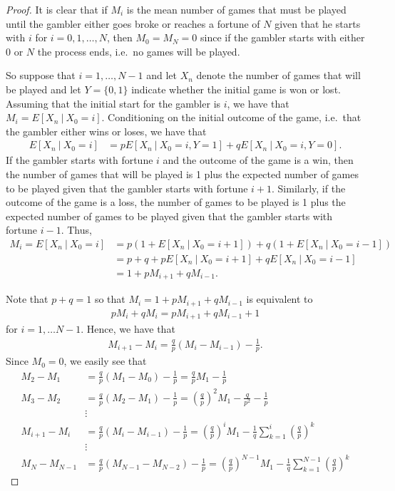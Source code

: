 \begin{proof}
  It is clear that if $M_i$ is the mean number of games that must be played until
  the gambler either goes broke or reaches a fortune of $N$ given that he
  starts with $i$ for $i =0,1,\dots,N$,
  then $M_0 = M_N = 0$ since if the gambler starts with either $0$ or $N$ the process ends, i.e.\
  no games will be played.

  So suppose that $i = 1, \dots, N -1$ and let $X_n$ denote the number of games that will be played
  and let $Y = \{0, 1\}$ indicate whether the initial game is won or lost.
  Assuming that the initial start for the gambler is $i$, we have that $M_i = E[X_n \ |\ X_0 = i]$.
  Conditioning on the initial outcome of the game, i.e.\ that the gambler either wins or loses, we have that
  \begin{align*}
    E[X_n \ |\ X_0 = i] &= p E[X_n \ |\ X_0 = i, Y=1] + q E[X_n \ |\ X_0 = i, Y= 0].
  \end{align*}
  If the gambler starts with fortune $i$ and the outcome of the game is a win, then the
  number of games that will be played is 1 plus the expected number of games
  to be played given that the gambler starts with fortune $i+1$. Similarly, if the
  outcome of the game is a loss, the number of games to be played is 1 plus the expected number
  of games to be played given that the gambler starts with fortune $i -1$.
  Thus,
  \begin{align*}
    M_i = E[X_n \ |\ X_0 = i] &= p(1 + E[X_n \ |\ X_0 = i+1]) + q(1 + E[X_n \ |\ X_0 = i-1]) \\
    &= p + q + pE[X_n \ |\ X_0 = i+1] + qE[X_n \ |\ X_0 = i-1] \\
    &= 1 + p M_{i+1} + q M_{i-1}.
  \end{align*}

  Note that $p + q = 1$ so that $M_i = 1 + p M_{i+1} + q M_{i-1}$ is equivalent to
  \begin{align*}
    p M_i + q M_i = pM_{i+ 1} + q M_{i-1} + 1
  \end{align*}
  for $i = 1, \dots N-1$. Hence, we have that
  \begin{align*}
    M_{i+1}- M_i  = \frac{q}{p}(M_i - M_{i-1}) - \frac{1}{p}.
  \end{align*}
  Since $M_0 = 0$, we easily see that
  \begin{align*}
    M_2 - M_1 &= \frac{q}{p}(M_1 - M_0) - \frac{1}{p} = \frac{q}{p}M_1 - \frac{1}{p}\\
    M_3 - M_2 &= \frac{q}{p}(M_2 - M_1) - \frac{1}{p} = \left(\frac{q}{p}\right)^2 M_1 - \frac{q}{p^2} - \frac{1}{p}\\
    &\vdots \\
    M_{i+1} - M_i &= \frac{q}{p}(M_i - M_{i-1}) - \frac{1}{p} = \left(\frac{q}{p}\right)^i M_1 - \frac{1}{q}\sum_{k=1}^i \left(\frac{q}{p}\right)^k\\
    &\vdots \\
    M_{N} - M_{N-1} &= \frac{q}{p}(M_{N-1} - M_{N-2}) - \frac{1}{p} = \left(\frac{q}{p}\right)^{N-1} M_1 - \frac{1}{q}\sum_{k=1}^{N-1} \left(\frac{q}{p}\right)^k
  \end{align*}


\end{proof}
